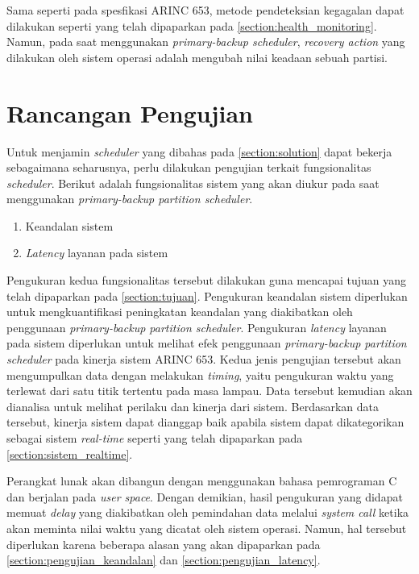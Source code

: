 Sama seperti pada spesfikasi ARINC 653, metode pendeteksian kegagalan dapat dilakukan seperti
yang telah dipaparkan pada \autoref{section:health_monitoring}. Namun, pada saat menggunakan
\textit{primary-backup scheduler}, \textit{recovery action} yang dilakukan oleh sistem operasi
adalah mengubah nilai keadaan sebuah partisi.

\section{Rancangan Pengujian}
\label{section:rancangan_pengujian}

Untuk menjamin \textit{scheduler} yang dibahas pada \autoref{section:solution} dapat bekerja
sebagaimana seharusnya, perlu dilakukan pengujian terkait fungsionalitas \textit{scheduler}.
Berikut adalah fungsionalitas sistem yang akan diukur pada saat menggunakan
\textit{primary-backup partition scheduler}.

\begin{enumerate}
	\item Keandalan sistem
	\item \textit{Latency} layanan pada sistem
\end{enumerate}

Pengukuran kedua fungsionalitas tersebut dilakukan guna mencapai tujuan yang telah dipaparkan
pada \autoref{section:tujuan}. Pengukuran keandalan sistem diperlukan untuk mengkuantifikasi
peningkatan keandalan yang diakibatkan oleh penggunaan \textit{primary-backup partition
scheduler}.  Pengukuran \textit{latency} layanan pada sistem diperlukan untuk melihat efek
penggunaan \textit{primary-backup partition scheduler} pada kinerja sistem ARINC 653. Kedua
jenis pengujian tersebut akan mengumpulkan data dengan melakukan \textit{timing}, yaitu
pengukuran waktu yang terlewat dari satu titik tertentu pada masa lampau. Data tersebut kemudian
akan dianalisa untuk melihat perilaku dan kinerja dari sistem. Berdasarkan data tersebut,
kinerja sistem dapat dianggap baik apabila sistem dapat dikategorikan sebagai sistem
\textit{real-time} seperti yang telah dipaparkan pada \autoref{section:sistem_realtime}.

Perangkat lunak akan dibangun dengan menggunakan bahasa pemrograman C dan berjalan pada
\textit{user space}. Dengan demikian, hasil pengukuran yang didapat memuat \textit{delay} yang
diakibatkan oleh pemindahan data melalui \textit{system call} ketika akan meminta nilai waktu
yang dicatat oleh sistem operasi. Namun, hal tersebut diperlukan karena beberapa alasan yang
akan dipaparkan pada \autoref{section:pengujian_keandalan} dan
\autoref{section:pengujian_latency}.

